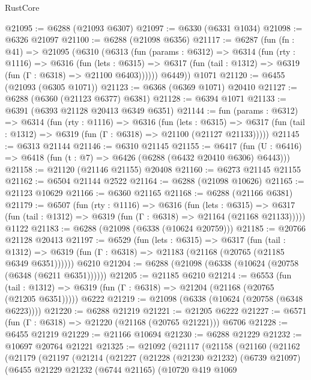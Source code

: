 \begin{lexlean}{RustCore}
\begin{coremodule}
@21095 := @6288 (@21093 @6307)
@21097 := @6330 (@6331 @1034)
@21098 := @6326 @21097
@21100 := @6288 (@21098 @6356)
@21117 := @6287
    (fun (fn : @41) =>
    @21095
      (@6310
        (@6313
          (fun (params : @6312) =>
          @6314
            (fun (rty : @1116) =>
            @6316
              (fun (lets : @6315) =>
              @6317 (fun (tail : @1312) => @6319 (fun (Γ : @6318) => @21100 @6403))))))
        @6449))
    @1071
@21120 := @6455 (@21093 (@6305 @1071))
@21123 := @6368 (@6369 @1071) @20410
@21127 := @6288 (@6360 (@21123 @6377) @6381)
@21128 := @6394 @1071
@21133 := @6391 (@6393 @21128 @20413 @6349 @6351)
@21144 := fun (params : @6312) =>
  @6314
    (fun (rty : @1116) =>
    @6316
      (fun (lets : @6315) =>
      @6317 (fun (tail : @1312) => @6319 (fun (Γ : @6318) => @21100 (@21127 @21133)))))
@21145 := @6313 @21144
@21146 := @6310 @21145
@21155 := @6417
    (fun (U : @6416) => @6418 (fun (t : @7) => @6426 (@6288 (@6432 @20410 @6306) @6443)))
@21158 := @21120 (@21146 @21155) @20408
@21160 := @6273 @21145 @21155
@21162 := @6504 @21144 @2522
@21164 := @6288 (@21098 @10626)
@21165 := @21123 @10629
@21166 := @6360 @21165
@21168 := @6288 (@21166 @6381)
@21179 := @6507
    (fun (rty : @1116) =>
    @6316
      (fun (lets : @6315) =>
      @6317 (fun (tail : @1312) => @6319 (fun (Γ : @6318) => @21164 (@21168 @21133)))))
    @1122
@21183 := @6288 (@21098 (@6338 (@10624 @20759)))
@21185 := @20766 @21128 @20413
@21197 := @6529
    (fun (lets : @6315) =>
    @6317
      (fun (tail : @1312) =>
      @6319 (fun (Γ : @6318) => @21183 (@21168 (@20765 (@21185 @6349 @6351))))))
    @6210
@21204 := @6288 (@21098 (@6338 (@10624 (@20758 (@6348 (@6211 @6351))))))
@21205 := @21185 @6210
@21214 := @6553
    (fun (tail : @1312) => @6319 (fun (Γ : @6318) => @21204 (@21168 (@20765 (@21205 @6351)))))
    @6222
@21219 := @21098 (@6338 (@10624 (@20758 (@6348 @6223))))
@21220 := @6288 @21219
@21221 := @21205 @6222
@21227 := @6571 (fun (Γ : @6318) => @21220 (@21168 (@20765 @21221))) @6706
@21228 := @6455 @21219
@21229 := @21166 @10694
@21230 := @6288 @21229
@21232 := @10697 @20764 @21221
@21325 := @21092
    (@21117
      (@21158
        (@21160
          (@21162
            (@21179
              (@21197
                (@21214
                  (@21227
                    (@21228
                      (@21230 @21232)
                      (@6739 @21097)
                      (@6455
                        @21229
                        @21232
                        (@6744 @21165)
                        (@10720
                          @419
                          @1069

\end{coremodule}
\end{lexlean}
